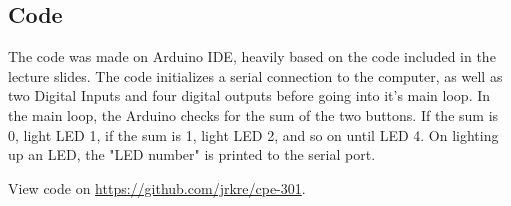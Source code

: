 \documentclass{article}
\begin{document}
\subsection{Code}

The code was made on Arduino IDE, heavily based on the code included in the lecture slides. The code initializes a serial connection to the computer, as well as two Digital Inputs and four digital outputs before going into it's main loop. In the main loop, the Arduino checks for the sum of the two buttons. If the sum is 0, light LED 1, if the sum is 1, light LED 2, and so on until LED 4. On lighting up an LED, the "LED number" is printed to the serial port.
 
View code on \href{GitHub}{https://github.com/jrkre/cpe-301}.
\end{document}
